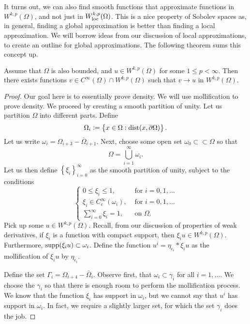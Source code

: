\documentclass[10pt]{article}
\begin{document}
It turns out, we can also find smooth functions that approximate functions in $W^{k,p}(\Omega)$, and not just in $W_{\operatorname{loc}}^{k,p}(\Omega)$. This is a nice property of Sobolev spaces as, in general, finding a global approximation is better than finding a local approximation. We will borrow ideas from our discussion of local approximations, to create an outline for global approximations. The following theorem sums this concept up. 
\begin{theorem}
	Assume that $\Omega$ is also bounded, and $u \in W^{k,p}(\Omega)$ for some $1 \leq p < \infty$. Then there exists functions $v \in C^{\infty}(\Omega) \cap W^{k,p}(\Omega)$ such that $v \to u$ in $W^{k,p}(\Omega)$. 
\end{theorem}
\begin{proof}
	Our goal here is to essentially prove density. We will use mollification to prove density. We proceed by creating a smooth partition of unity. Let us partition $\Omega$ into different parts. 
	Define
	\begin{equation*}
		\displaystyle \Omega_i := \left\{ x \in \Omega : \operatorname{dist}(x,\partial \Omega) \right\}.
	\end{equation*}
	Let us write $\omega_{i} = \Omega_{i+3} - \bar{\Omega}_{i+1}$. Next, choose some open set $\omega_0 \subset \subset \Omega$ so that 
	\begin{equation*}
		\displaystyle \Omega = \bigcup\limits_{i=1}^{\infty}{\omega_i}. 
	\end{equation*}
	Let us then define $\left\{\xi_i \right\}_{i=0}^{\infty}$ as the smooth partition of unity, subject to the conditions 
	\begin{equation*}
		\displaystyle \begin{cases}
			0 \leq \xi_i \leq 1, & \textrm{ for } i = 0,1,\dots \\
			\xi_i \in C_{c}^{\infty}(\omega_i), & \textrm{ for } i = 0,1,\dots \\
			\sum\limits_{i=0}^{\infty}{\xi_i} = 1, & \textrm{ on } \Omega.
		\end{cases}
	\end{equation*} 
	Pick up some $u \in W^{k,p}(\Omega)$. Recall, from our discussion of properties of weak derivatives, if $\xi_i$ is a function with compact support, then $\xi_i u \in W^{k,p}(\Omega)$. Furthermore, $\operatorname{supp}(\xi_i u) \subset \omega_i$. Define the function $u^i = \eta_{\epsilon_i} * \xi_i u$ as the mollification of $\xi_i u$ by $\eta_{\epsilon_i}$. 
	
	Define the set $\Gamma_i = \Omega_{i+4} - \bar{\Omega}_i$. Observe first, that $\omega_i \subset \gamma_i$ for all $i = 1,\dots$. We choose the $\gamma_i$ so that there is enough room to perform the mollification process. We know that the function $\xi_i$ has support in $\omega_i$, but we cannot say that $u^i$ has support in $\omega_i$. In fact, we require a slightly larger set, for which the set $\gamma_i$ does the job. 
	

\end{proof}
\end{document}
